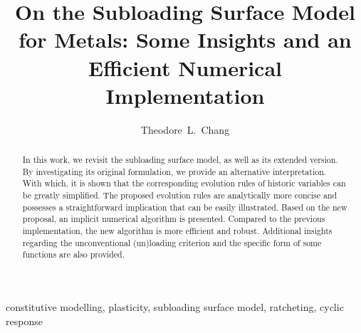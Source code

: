 \documentclass[3p,sort&compress,11pt,fleqn,review]{elsarticle}
\begin{document}
\linenumbers
\begin{abstract}
    \begin{linenumbers}
        In this work, we revisit the subloading surface model, as well as its extended version.
        By investigating its original formulation, we provide an alternative interpretation.
        With which, it is shown that the corresponding evolution rules of historic variables can be greatly simplified.
        The proposed evolution rules are analytically more concise and possesses a straightforward implication that can be easily illustrated.
        Based on the new proposal, an implicit numerical algorithm is presented.
        Compared to the previous implementation, the new algorithm is more efficient and robust.
        Additional insights regarding the unconventional (un)loading criterion and the specific form of some functions are also provided.
    \end{linenumbers}
\end{abstract}
\begin{keyword}
    constitutive modelling\sep
    plasticity\sep
    subloading surface model\sep
    ratcheting\sep
    cyclic response
\end{keyword}
\begin{frontmatter}
    \title{On the Subloading Surface Model for Metals: Some Insights and an Efficient Numerical Implementation}
    \author[add1]{Theodore~L.~Chang}
    \address[add1]{IRIS Adlershof, Humboldt-Universität zu Berlin, Berlin, Germany, 12489.}
\end{frontmatter}





\end{document}
